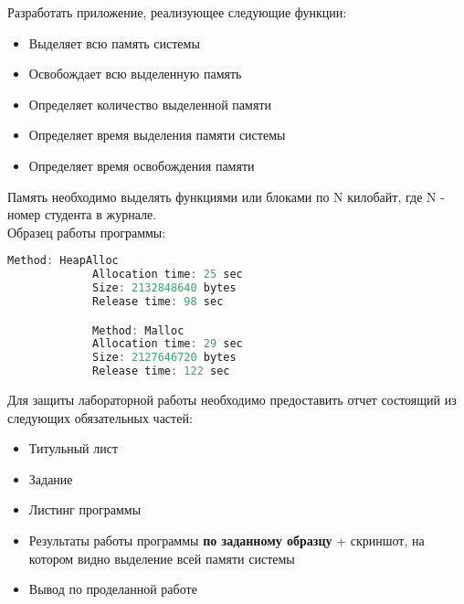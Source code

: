 \documentclass[a4paper,12pt]{article}
\begin{document}

    \begin{flushleft}
        Разработать приложение, реализующее следующие функции:
        \begin{itemize}
            \item Выделяет всю память системы
            \item Освобождает всю выделенную память
            \item Определяет количество выделенной памяти
            \item Определяет время выделения памяти системы
            \item Определяет время освобождения памяти
        \end{itemize}
    \end{flushleft}
  
    Память необходимо выделять функциями  или  блоками по N килобайт, где N - номер студента в журнале. \\

    Образец работы программы:
    \begin{flushleft}
        \begin{lstlisting}[language=c, 
                           breaklines=true, 
                           showtabs=false, 
                           showspaces=false, 
                           showstringspaces=false,
                           basicstyle=\ttfamily \footnotesize]
             Method: HeapAlloc
             Allocation time: 25 sec 
             Size: 2132848640 bytes 
             Release time: 98 sec

             Method: Malloc 
             Allocation time: 29 sec 
             Size: 2127646720 bytes 
             Release time: 122 sec
        \end{lstlisting}
    \end{flushleft}

    Для защиты лабораторной работы необходимо предоставить отчет состоящий из следующих обязательных частей:
    \begin{itemize}
        \item Титульный лист
        \item Задание
        \item Листинг программы
        \item Результаты работы программы \textbf{по заданному образцу} + скриншот, на котором видно выделение всей памяти системы
        \item Вывод по проделанной работе
    \end{itemize}
  
\end{document}
